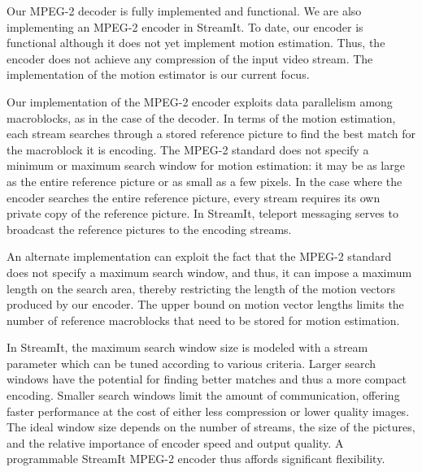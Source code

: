 
Our MPEG-2 decoder is fully implemented and functional. We are also
implementing an MPEG-2 encoder in StreamIt. To date, our encoder is
functional although it does not yet implement motion estimation. Thus,
the encoder does not achieve any compression of the input video
stream. The implementation of the motion estimator is our current
focus.

Our implementation of the MPEG-2 encoder exploits data parallelism
among macroblocks, as in the case of the decoder.  In terms of the
motion estimation, each stream searches through a stored reference
picture to find the best match for the macroblock it is  encoding. The
MPEG-2 standard does not specify a minimum or maximum search window
for motion estimation: it may be as large as the entire reference
picture or as small as a few pixels.  In the case where the encoder
searches the entire reference picture, every stream requires its own
private copy of the reference picture. In StreamIt, teleport messaging
serves to broadcast the reference pictures to the encoding streams.

An alternate implementation can exploit the fact that the MPEG-2
standard does not specify a maximum search window, and thus, it can
impose a maximum length on the search area, thereby restricting the
length of the motion vectors produced by our encoder.  The upper bound
on motion vector lengths limits the number of reference macroblocks
that need to be stored for motion estimation.

In StreamIt, the maximum search window size is modeled with a stream
parameter which can be tuned according to various criteria.  Larger
search windows have the potential for finding better matches and thus
a more compact encoding.  Smaller search windows limit the amount of
communication, offering faster performance at the cost of either less
compression or lower quality images.  The ideal window size depends on
the number of streams, the size of the pictures, and the relative
importance of encoder speed and output quality. A programmable
StreamIt MPEG-2 encoder thus affords significant flexibility.